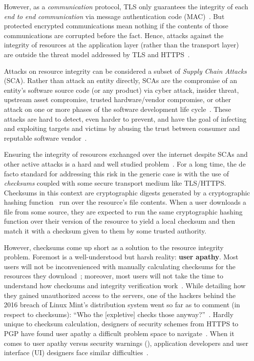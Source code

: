 However, as a \textit{communication} protocol, TLS only guarantees the integrity
of each \textit{end to end communication} via message authentication code
(MAC)~\cite{TLS1.2}. But protected encrypted communications mean nothing if the
contents of those communications are corrupted before the fact. Hence, attacks
against the integrity of resources at the application layer (rather than the
transport layer) are outside the threat model addressed by TLS and
HTTPS~\cite{TLS1.2, HTTPS}.

Attacks on resource integrity can be considered a subset of \emph{Supply Chain
Attacks} (SCA). Rather than attack an entity directly, SCAs are the compromise
of an entity's software source code (or any product) via cyber attack, insider
threat, upstream asset compromise, trusted hardware/vendor compromise, or other
attack on one or more phases of the software development life
cycle~\cite{NIST-SCA}. These attacks are hard to detect, even harder to prevent,
and have the goal of infecting and exploiting targets and victims by abusing the
trust between consumer and reputable software vendor~\cite{SCA}.

Ensuring the integrity of resources exchanged over the internet despite SCAs and
other active attacks is a hard and well studied problem~\cite{MD5Header,
HTTP1.1, HTTPS, SRI, LF, OpenPGP1, DNSSEC, PKI, Cherubini, Stickler}. For a long
time, the de facto standard for addressing this risk in the generic case is with
the use of \textit{checksums} coupled with some secure transport medium like
TLS/HTTPS. Checksums in this context are cryptographic digests generated by a
cryptographic hashing function~\cite{Rogaway} run over the resource's file
contents. When a user downloads a file from some source, they are expected to
run the same cryptographic hashing function over their version of the resource
to yield a local checksum and then match it with a checksum given to them by
some trusted authority.

However, checksums come up short as a solution to the resource integrity
problem. Foremost is a well-understood but harsh reality: \textbf{user apathy}.
Most users will not be inconvenienced with manually calculating checksums for
the resources they download~\cite{Cherubini, Fagan}; moreover, most users will
not take the time to understand how checksums and integrity verification
work~\cite{Cherubini, Tan, Hsiao}. While detailing how they gained unauthorized
access to the servers, one of the hackers behind the 2016 breach of Linux Mint's
distribution system went so far as to comment (in respect to checksums): ``Who
the [expletive] checks those anyway?''~\cite{SCA-MINT3}. Hardly unique to
checksum calculation, designers of security schemes from HTTPS to PGP have found
user apathy a difficult problem space to navigate~\cite{PGPBad, Cherubini}. When
it comes to user apathy versus security warnings (),
application developers and user interface (UI) designers face similar
difficulties~\cite{Clickthrough, Egelman1, Egelman2, Jenkins, Modic, Reeder,
Silic, Sunshine, Bianchi, Akhawe}.

